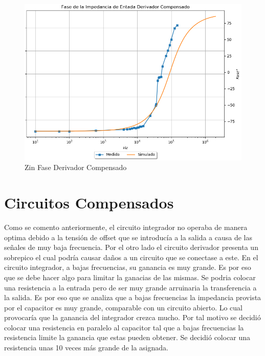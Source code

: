 \documentclass[a4paper]{article}
\begin{document}
\begin{figure}[H]
	\centering
	\includegraphics[width=\textwidth]{Ejercicio4/SUPERPOSICION-ZIN-DERIVADOR-COMPENSADO-FASE} 
	\caption{Zin Fase Derivador Compensado}
\end{figure}

\section{Circuitos Compensados}
Como se comento anteriormente, el circuito integrador no operaba de manera optima debido a la tensión de offset que se introducía a la salida a causa de las señales de muy baja frecuencia. Por el otro lado el circuito derivador presenta un sobrepico el cual podría causar daños a un circuito que se conectase a este. 
En el circuito integrador, a bajas frecuencias, su ganancia es muy grande. Es por eso que se debe hacer algo para limitar la ganacias de las mismas. Se podria colocar una resistencia a la entrada pero de ser muy grande arruinaria la transferencia a la salida. Es por eso que se analiza que a bajas frecuencias la impedancia provista por el capacitor es muy grande, comparable con un circuito abierto. Lo cual provocaría que la ganancia del integrador crezca mucho. Por tal motivo se decidió colocar una resistencia en paralelo al capacitor tal que a bajas frecuencias la resistencia limite la ganancia que estas pueden obtener. 
Se decidió colocar una resistencia unas 10 veces más grande de la asignada. 
\end{document}
